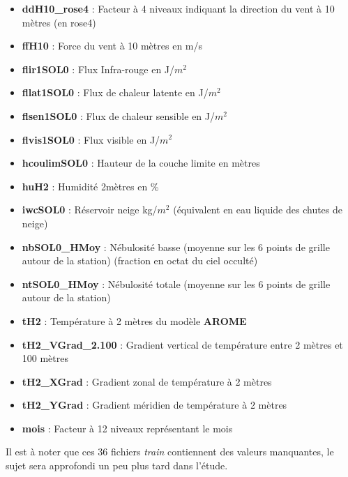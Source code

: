 \documentclass[14pt, openany]{article}
\begin{document}
\begin{itemize}
\item \textbf{ddH10\_rose4} : Facteur à 4 niveaux indiquant la direction du vent à 10 mètres (en rose4)
\item \textbf{ffH10} : Force du vent à 10 mètres en m/s
\item \textbf{flir1SOL0} : Flux Infra-rouge en J/$m^2$
\item \textbf{fllat1SOL0} : Flux de chaleur latente en J/$m^2$
\item \textbf{flsen1SOL0} : Flux de chaleur sensible en J/$m^2$
\item \textbf{flvis1SOL0} : Flux visible en J/$m^2$
\item \textbf{hcoulimSOL0} : Hauteur de la couche limite en mètres
\item \textbf{huH2} : Humidité 2mètres en \%
\item \textbf{iwcSOL0} : Réservoir neige kg/$m^2$ (équivalent en eau liquide des chutes de neige)
\item \textbf{nbSOL0\_HMoy} : Nébulosité basse (moyenne sur les 6 points de grille autour de la station) (fraction en octat du ciel occulté)
\item \textbf{ntSOL0\_HMoy} : Nébulosité totale (moyenne sur les 6 points de grille autour de la station)
\item \textbf{tH2} : Température à 2 mètres du modèle \textbf{AROME}
\item \textbf{tH2\_VGrad\_2.100} : Gradient vertical de température entre 2 mètres et 100 mètres
\item \textbf{tH2\_XGrad} : Gradient zonal de température à 2 mètres
\item \textbf{tH2\_YGrad} : Gradient méridien de température à 2 mètres
\item \textbf{mois} : Facteur à 12 niveaux représentant le mois
\end{itemize}
Il est à noter que ces 36 fichiers \textit{train} contiennent des valeurs manquantes, le sujet sera approfondi un peu plus tard dans l'étude.
\end{document}
